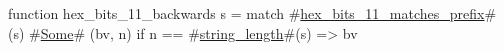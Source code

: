 function hex_bits_11_backwards s =
  match #\hyperref[sailRISCVzhexzybitszy11zymatcheszyprefix]{hex\_bits\_11\_matches\_prefix}#(s) {
      #\hyperref[sailRISCVzSome]{Some}# (bv, n) if n == #\hyperref[sailRISCVzstringzylength]{string\_length}#(s) => bv
  }
